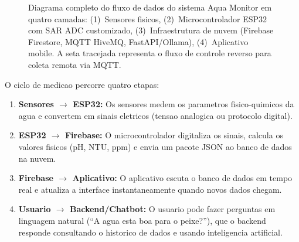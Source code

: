 \documentclass[12pt, a4paper]{article}
\begin{document}
\begin{figure}[H]
\caption{Diagrama completo do fluxo de dados do sistema Aqua Monitor em quatro camadas:
(1)~Sensores fisicos, (2)~Microcontrolador ESP32 com SAR ADC customizado, (3)~Infraestrutura
de nuvem (Firebase Firestore, MQTT HiveMQ, FastAPI/Ollama), (4)~Aplicativo mobile. A seta
tracejada representa o fluxo de controle reverso para coleta remota via MQTT.}
\label{fig:dataflow}
\end{figure}

\begin{conceitobox}
O ciclo de medicao percorre quatro etapas:
\begin{enumerate}[leftmargin=*, label=\textbf{\arabic*.}]
  \item \textbf{Sensores $\to$ ESP32:} Os sensores medem os parametros fisico-quimicos da agua
        e convertem em sinais eletricos (tensao analogica ou protocolo digital).
  \item \textbf{ESP32 $\to$ Firebase:} O microcontrolador digitaliza os sinais, calcula os
        valores fisicos (pH, NTU, ppm) e envia um pacote JSON ao banco de dados na nuvem.
  \item \textbf{Firebase $\to$ Aplicativo:} O aplicativo escuta o banco de dados em tempo real
        e atualiza a interface instantaneamente quando novos dados chegam.
  \item \textbf{Usuario $\to$ Backend/Chatbot:} O usuario pode fazer perguntas em linguagem
        natural (``A agua esta boa para o peixe?''), que o backend responde consultando o
        historico de dados e usando inteligencia artificial.
\end{enumerate}
\end{conceitobox}
\end{document}
